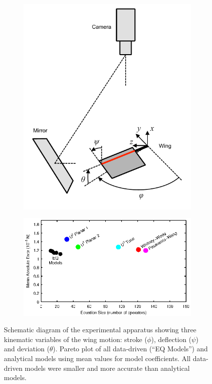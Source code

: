 \documentclass[fleqn,10pt]{wlscirep}
\begin{document}
\begin{figure}%
\centering
\begin{subfigure}{0.3\textwidth}
\includegraphics[trim=0 15 0 5, clip, width=\textwidth]{figures/apparatus}
\caption{\label{fig:apparatus}}
\end{subfigure}
\qquad
\begin{subfigure}{0.5\textwidth}
\centering
\includegraphics[width=\textwidth]{figures/pareto_mae_nofit_PNAS}
\caption{\label{fig:pareto_mae}}
\end{subfigure}
\caption{ Schematic diagram of the experimental apparatus showing three
  kinematic variables of the wing motion: stroke ($\phi$), deflection ($\psi$) and deviation
  ($\theta$).  Pareto plot of all data-driven (``EQ Models'') and analytical
  models using mean values for model coefficients. All data-driven models were smaller and more
  accurate than analytical models.
}
\end{figure}
\end{document}

